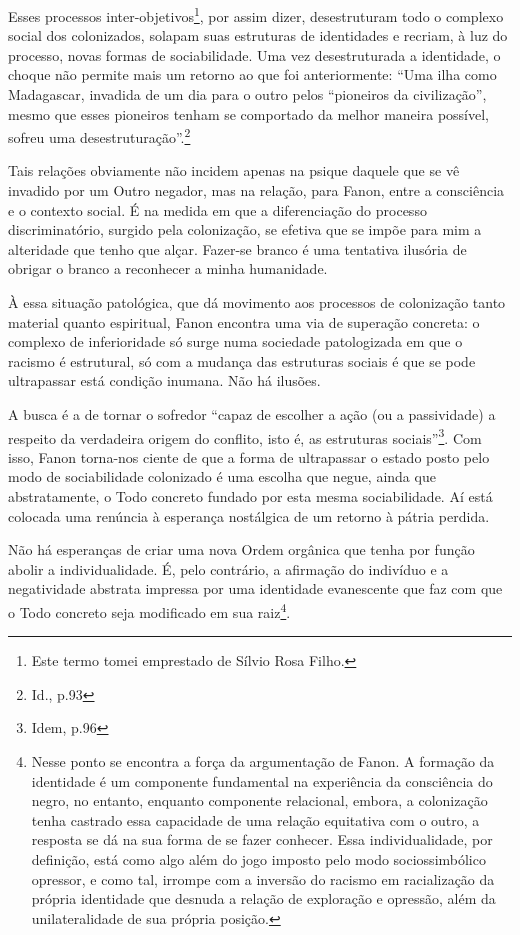 Esses processos inter-objetivos\footnote{Este termo tomei emprestado de
  Sílvio Rosa Filho.}, por assim dizer, desestruturam todo o complexo
social dos colonizados, solapam suas estruturas de identidades e
recriam, à luz do processo, novas formas de sociabilidade. Uma vez
desestruturada a identidade, o choque não permite mais um retorno ao que
foi anteriormente: ``Uma ilha como Madagascar, invadida de um dia para o
outro pelos ``pioneiros da civilização'', mesmo que esses pioneiros
tenham se comportado da melhor maneira possível, sofreu uma
desestruturação''.\footnote{Id., p.93}

Tais relações obviamente não incidem apenas na psique daquele que se vê
invadido por um Outro negador, mas na relação, para Fanon, entre a
consciência e o contexto social. É na medida em que a diferenciação do
processo discriminatório, surgido pela colonização, se efetiva que se
impõe para mim a alteridade que tenho que alçar. Fazer-se branco é uma
tentativa ilusória de obrigar o branco a reconhecer a minha humanidade.

À essa situação patológica, que dá movimento aos processos de
colonização tanto material quanto espiritual, Fanon encontra uma via de
superação concreta: o complexo de inferioridade só surge numa sociedade
patologizada em que o racismo é estrutural, só com a mudança das
estruturas sociais é que se pode ultrapassar está condição inumana. Não
há ilusões.

A busca é a de tornar o sofredor ``capaz de escolher a ação (ou a
passividade) a respeito da verdadeira origem do conflito, isto é, as
estruturas sociais''\footnote{Idem, p.96}. Com isso, Fanon torna-nos
ciente de que a forma de ultrapassar o estado posto pelo modo de
sociabilidade colonizado é uma escolha que negue, ainda que
abstratamente, o Todo concreto fundado por esta mesma sociabilidade. Aí
está colocada uma renúncia à esperança nostálgica de um retorno à pátria
perdida.

Não há esperanças de criar uma nova Ordem orgânica que tenha por função
abolir a individualidade. É, pelo contrário, a afirmação do indivíduo e
a negatividade abstrata impressa por uma identidade evanescente que faz
com que o Todo concreto seja modificado em sua raiz\footnote{Nesse ponto
  se encontra a força da argumentação de Fanon. A formação da identidade
  é um componente fundamental na experiência da consciência do negro, no
  entanto, enquanto componente relacional, embora, a colonização tenha
  castrado essa capacidade de uma relação equitativa com o outro, a
  resposta se dá na sua forma de se fazer conhecer. Essa
  individualidade, por definição, está como algo além do jogo imposto
  pelo modo sociossimbólico opressor, e como tal, irrompe com a inversão
  do racismo em racialização da própria identidade que desnuda a relação
  de exploração e opressão, além da unilateralidade de sua própria
  posição.}.

